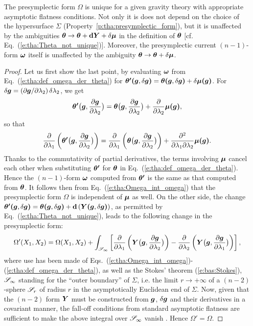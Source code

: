 \begin{prop}
\label{p:tha:uniqueness_presympl}
The presymplectic form $\Omega$ is unique for a given gravity theory with
appropriate asymptotic flatness conditions. Not only it is
does not depend on the choice of the
hypersurface $\Sigma$ (Property~\ref{p:tha:presymplectic_form}),
but it is unaffected by the ambiguities
$\bm{\theta} \to \bm{\theta} + \mathbf{d} \bm{Y} + \delta\bm{\mu}$
in the definition of $\bm{\theta}$ [cf. Eq.~(\ref{e:tha:Theta_not_unique})].
Moreover, the presymplectic current $(n-1)$-form $\bm{\omega}$ itself is unaffected
by the ambiguity
$\bm{\theta} \to \bm{\theta} + \delta\bm{\mu}$.
\end{prop}

\begin{proof}
Let us first show the last point, by evaluating $\bm{\omega}$
from Eq.~(\ref{e:tha:def_omega_der_theta})
for $\bm{\theta'}\textbf{(}\bm{g},\delta\bm{g}\textbf{)} = \bm{\theta}\textbf{(}\bm{g},\delta\bm{g}\textbf{)}
+ \delta \bm{\mu}\textbf{(}\bm{g}\textbf{)}$.
For $\delta\bm{g} = ({\partial \bm{g}}/{\partial \lambda_2}) \, \delta \lambda_2$, we get
\[
\bm{\theta'}\bm{\big(}\bm{g}, \frac{\partial \bm{g}}{\partial \lambda_2} \bm{\big)} = \bm{\theta}\bm{\big(}\bm{g}, \frac{\partial \bm{g}}{\partial \lambda_2} \bm{\big)} + \frac{\partial }{\partial \lambda_2} \bm{\mu}\textbf{(}\bm{g}\textbf{)} ,
\]
so that
\[
  \frac{\partial }{\partial \lambda_1}
        \left( \bm{\theta'}\bm{\big(}\bm{g}, \frac{\partial \bm{g}}{\partial \lambda_2} \bm{\big)}\right)
    = \frac{\partial }{\partial \lambda_1}
        \left( \bm{\theta}\bm{\big(}\bm{g}, \frac{\partial \bm{g}}{\partial \lambda_2} \bm{\big)}\right)
        + \frac{\partial^2}{\partial\lambda_1\partial\lambda_2} \bm{\mu}\textbf{(}\bm{g}\textbf{)}
 .
\]
Thanks to the commutativity of partial derivatives, the terms
involving $\bm{\mu}$ cancel each other when substituting $\bm{\theta'}$
for $\bm{\theta}$ in Eq.~(\ref{e:tha:def_omega_der_theta}).
Hence the $(n-1)$-form $\bm{\omega}$ computed from $\bm{\theta'}$
is the same as that computed from $\bm{\theta}$.
It follows then from Eq.~(\ref{e:tha:Omega_int_omega}) that
the presymplectic form $\Omega$ is independent of $\bm{\mu}$ as well.
On the other side,
the change  $\bm{\theta'}\textbf{(}\bm{g},\delta\bm{g}\textbf{)} = \bm{\theta}\textbf{(}\bm{g},\delta\bm{g}\textbf{)}
+ \mathbf{d} \left(\bm{Y}\textbf{(}\bm{g},\delta\bm{g}\textbf{)} \right)$, as permitted by Eq.~(\ref{e:tha:Theta_not_unique}),
leads to the following change in the presymplectic form:
\[
    \Omega'(X_1, X_2) = \Omega(X_1, X_2) + \int_{\mathscr{S}_\infty}
    \left[ \frac{\partial }{\partial \lambda_1}
        \left( \bm{Y}\bm{\big(}\bm{g}, \frac{\partial \bm{g}}{\partial \lambda_2} \bm{\big)}\right)
        - \frac{\partial }{\partial \lambda_2}\left( \bm{Y}\bm{\big(}\bm{g}, \frac{\partial \bm{g}}{\partial \lambda_1} \bm{\big)} \right) \right] ,
\]
where use has been made of Eqs.~(\ref{e:tha:Omega_int_omega})-(\ref{e:tha:def_omega_der_theta}),
as well as the Stokes' theorem (\ref{e:bas:Stokes}),
$\mathscr{S}_\infty$ standing for the ``outer boundary'' of $\Sigma$, i.e. the limit
$r\to +\infty$ of a $(n-2)$-sphere $\mathscr{S}_r$ of radius $r$ in the asymptotically Euclidean end
of $\Sigma$. Now, given that the $(n-2)$ form $\bm{Y}$ must be constructed from
$\bm{g}$, $\delta\bm{g}$ and their derivatives in a covariant manner, the fall-off
conditions from standard asymptotic flatness are sufficient to make
the above integral over $\mathscr{S}_\infty$ vanish \cite{IyerW94}. Hence $\Omega' = \Omega$.
\end{proof}


